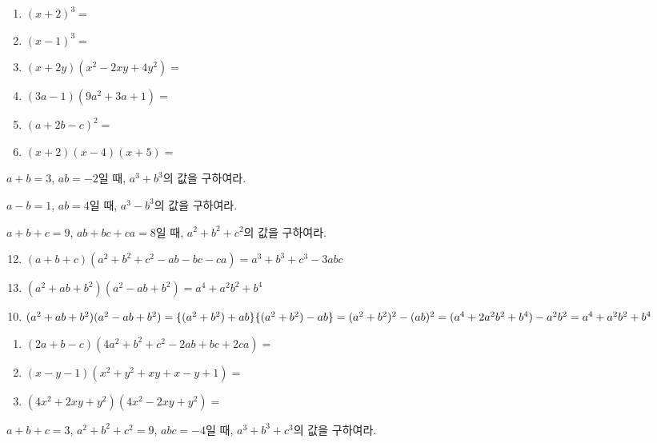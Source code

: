 \documentclass{oblivoir}
\begin{document}
%

%
\begin{enumerate}[(1)]
\item
\((x+2)^3=\)
\item
\((x-1)^3=\)
\item
\((x+2y)(x^2-2xy+4y^2)=\)
\item
\((3a-1)(9a^2+3a+1)=\)
\item
\((a+2b-c)^2=\)
\item
\((x+2)(x-4)(x+5)=\)
\end{enumerate}

%
\prob{}
\(a+b=3\), \(ab=-2\)일 때, \(a^3+b^3\)의 값을 구하여라.

%
\prob{}
\(a-b=1\), \(ab=4\)일 때, \(a^3-b^3\)의 값을 구하여라.

%
\prob{}
\(a+b+c=9\), \(ab+bc+ca=8\)일 때, \(a^2+b^2+c^2\)의 값을 구하여라.

\newpage
%
\begin{mdframed}
\begin{enumerate}[(1)]
\setcounter{enumi}{11}
\item
\((a+b+c)(a^2+b^2+c^2-ab-bc-ca)=a^3+b^3+c^3-3abc\)
\item
\((a^2+ab+b^2)(a^2-ab+b^2)=a^4+a^2b^2+b^4\)
\end{enumerate}
\end{mdframed}

%
\begin{enumerate}[(1)]
\setcounter{enumi}{9}
\item
\((a^2+ab+b^2)(a^2-ab+b^2)=\{(a^2+b^2)+ab\}\{(a^2+b^2)-ab\}\\
=(a^2+b^2)^2-(ab)^2=(a^4+2a^2b^2+b^4)-a^2b^2=a^4+a^2b^2+b^4\)
\end{enumerate}

%

%
\begin{enumerate}[(1)]
\item
\((2a+b-c)(4a^2+b^2+c^2-2ab+bc+2ca)=\)
\item
\((x-y-1)(x^2+y^2+xy+x-y+1)=\)
\item
\((4x^2+2xy+y^2)(4x^2-2xy+y^2)=\)
\end{enumerate}

%
\prob{}
\(a+b+c=3\), \(a^2+b^2+c^2=9\), \(abc=-4\)일 때, \(a^3+b^3+c^3\)의 값을 구하여라.
\end{document}

